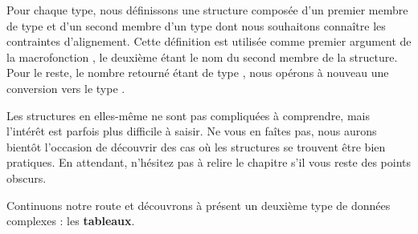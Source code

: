 Pour chaque type, nous définissons une structure composée d'un premier
membre de type  et d'un second membre d'un type dont nous
souhaitons connaître les contraintes d'alignement. Cette définition est
utilisée comme premier argument de la macrofonction ,
le deuxième étant le nom du second membre de la structure. Pour le
reste, le nombre retourné étant de type , nous opérons à
nouveau une conversion vers le type .

\hrulefill

Les structures en elles-même ne sont pas compliquées à comprendre, mais 
l'intérêt est   parfois plus difficile à saisir. Ne vous en faîtes pas,
nous aurons bientôt l'occasion de découvrir des cas où les structures se
trouvent être bien pratiques. En attendant, n'hésitez pas à relire le 
chapitre s'il vous reste des points obscurs.

Continuons notre route et découvrons à présent un deuxième type de
données complexes : les \textbf{tableaux}.
